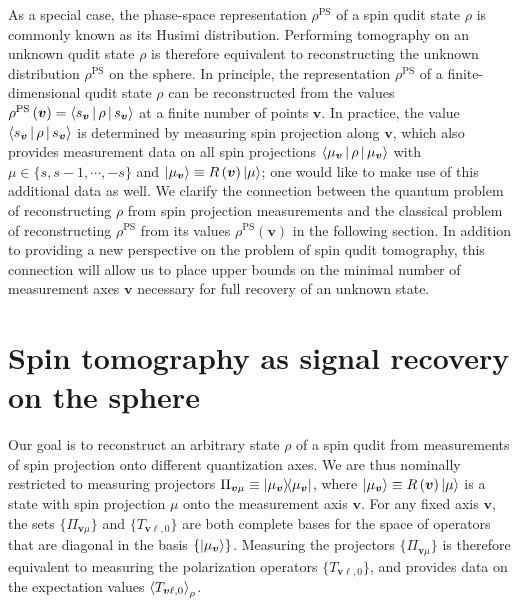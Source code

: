 \documentclass[a4paper,twocolumn,unpublished]{quantumarticle}
\renewcommand{\t}{\text} %
\newcommand{\p}[1]{\left(#1\right)} %
\newcommand{\bk}{\Braket} %
\renewcommand{\set}[1]{\{#1\}} %
\begin{document}
As a special case, the phase-space representation $\rho^{\t{PS}}$ of a spin qudit state $\rho$ is commonly known as its Husimi distribution.
Performing tomography on an unknown qudit state $\rho$ is therefore equivalent to reconstructing the unknown distribution $\rho^{\t{PS}}$ on the sphere.
In principle, the representation $\rho^{\t{PS}}$ of a finite-dimensional qudit state $\rho$ can be reconstructed from the values $\rho^{\t{PS}}\p{\bm v}=\bk{s_{\bm v}|\rho|s_{\bm v}}$ at a finite number of points $\bm v$.
In practice, the value $\bk{s_{\bm v}|\rho|s_{\bm v}}$ is determined by measuring spin projection along $\bm v$, which also provides measurement data on all spin projections $\bk{\mu_{\bm v}|\rho|\mu_{\bm v}}$ with $\mu\in\set{s,s-1,\cdots,-s}$ and $\ket{\mu_{\bm v}}\equiv R\p{\bm v}\ket{\mu}$; one would like to make use of this additional data as well.
We clarify the connection between the quantum problem of reconstructing $\rho$ from spin projection measurements and the classical problem of reconstructing $\rho^{\t{PS}}$ from its values $\rho^{\t{PS}}\p{\bm v}$ in the following section.
In addition to providing a new perspective on the problem of spin qudit tomography, this connection will allow us to place upper bounds on the minimal number of measurement axes $\bm v$ necessary for full recovery of an unknown state.

\section{Spin tomography as signal recovery on the sphere}
\label{sec:signal_recovery}


Our goal is to reconstruct an arbitrary state $\rho$ of a spin qudit from measurements of spin projection onto different quantization axes.
We are thus nominally restricted to measuring projectors $\Pi_{\bm v\mu} \equiv \op{\mu_{\bm v}}$, where $\ket{\mu_{\bm v}}\equiv R\p{\bm v}\ket{\mu}$ is a state with spin projection $\mu$ onto the measurement axis $\bm v$.
For any fixed axis $\bm v$, the sets $\set{\Pi_{\bm v\mu}}$ and $\set{T_{\bm v\ell,0}}$ are both complete bases for the space of operators that are diagonal in the basis $\set{\ket{\mu_{\bm v}}}$.
Measuring the projectors $\set{\Pi_{\bm v\mu}}$ is therefore equivalent to measuring the polarization operators $\set{T_{\bm v\ell,0}}$, and provides data on the expectation values $\bk{T_{\bm v\ell,0}}_\rho$.
\end{document}
